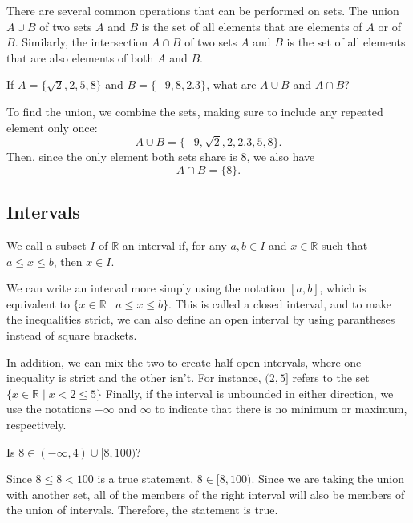 \noindent
There are several common operations that can be performed on sets.
The union $A \cup B$ of two sets $A$ and $B$ is the set of all elements that are elements of $A$ or of $B$. 
Similarly, the intersection $A \cap B$ of two sets $A$ and $B$ is the set of all elements that are also elements of both $A$ and $B$.
\begin{example}
	If $A = \{\sqrt{2}, 2, 5, 8\}$ and $B = \{-9, 8, 2.3\}$, what are $A \cup B$ and $A \cap B$?		
\end{example}
\begin{answer}
	To find the union, we combine the sets, making sure to include any repeated element only once:
	\begin{equation*}
		A \cup B = \{-9, \sqrt{2}, 2, 2.3, 5, 8\}.
	\end{equation*}
	Then, since the only element both sets share is 8, we also have
	\begin{equation*}
		A \cap B = \{8\}.
	\end{equation*}
\end{answer}

\subsection{Intervals}
\begin{definition}
	We call a subset $I$ of $\mathbb{R}$ an interval if, for any $a, b \in I$ and $x \in \mathbb{R}$ such that $a \leq x \leq b$, then $x \in I$. 
\end{definition}
We can write an interval more simply using the notation $[a, b]$, which is equivalent to $\{x \in \mathbb{R} \mid a \leq x \leq b\}$. 
This is called a closed interval, and to make the inequalities strict, we can also define an open interval by using parantheses instead of square brackets.\bigskip

In addition, we can mix the two to create half-open intervals, where one inequality is strict and the other isn't. 
For instance, $(2, 5]$ refers to the set $\{x \in \mathbb{R} \mid x < 2 \leq 5\}$
Finally, if the interval is unbounded in either direction, we use the notations $-\infty$ and $\infty$ to indicate that there is no minimum or maximum, respectively.

\begin{example}
	Is $8 \in (-\infty, 4) \cup [8, 100)$?
\end{example}
\begin{answer}
	Since $8 \leq 8 < 100$ is a true statement, $8 \in [8, 100)$. 
	Since we are taking the union with another set, all of the members of the right interval will also be members of the union of intervals. 
	Therefore, the statement is true.
\end{answer}